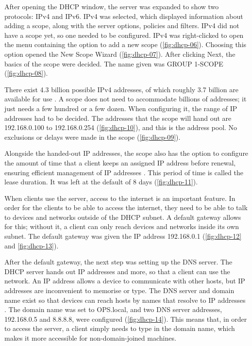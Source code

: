 After opening the DHCP window, the server was expanded to show two protocols: IPv4 and IPv6. IPv4 was selected, which displayed information about adding a scope, along with the server options, policies and filters. IPv4 did not have a scope yet, so one needed to be configured. IPv4 was right-clicked to open the menu containing the option to add a new scope (\autoref{fig:dhcp-06}). Choosing this option opened the New Scope Wizard (\autoref{fig:dhcp-07}). After clicking Next, the basics of the scope were decided. The name given was GROUP 1-SCOPE (\autoref{fig:dhcp-08}).


There exist 4.3 billion possible IPv4 addresses, of which roughly 3.7 billion are available for use \cite{ipme-ipv4}. A scope does not need to accommodate billions of addresses; it just needs a few hundred or a few dozen. When configuring it, the range of IP addresses had to be decided. The addresses that the scope will hand out are 192.168.0.100 to 192.168.0.254 (\autoref{fig:dhcp-10}), and this is the address pool. No exclusions or delays were made in the scope (\autoref{fig:dhcp-09}).

Alongside the handed-out IP addresses, the scope also has the option to configure the amount of time that a client keeps an assigned IP address before renewal, ensuring efficient management of IP addresses \cite{rapidseedbox-lease}. This period of time is called the lease duration. It was left at the default of 8 days (\autoref{fig:dhcp-11}).


When clients use the server, access to the internet is an important feature. In order for the clients to be able to access the internet, they need to be able to talk to devices and networks outside of the DHCP subnet. A default gateway allows for this; without it, a client can only reach devices and networks inside its own subnet. The default gateway was given the IP address 192.168.0.1 (\autoref{fig:dhcp-12} and \autoref{fig:dhcp-13}).


After the default gateway, the next step was setting up the DNS server. The DHCP server hands out IP addresses and more, so that a client can use the network. An IP address allows a device to communicate with other hosts, but IP addresses are inconvenient to memorise or type. The DNS server and domain name exist so that devices can reach hosts by names that resolve to IP addresses \cite{msft-dhcp-dns}. The domain name was set to OPS.local, and two DNS server addresses, 192.168.0.5 and 8.8.8.8, were configured (\autoref{fig:dhcp-14}). This means that, in order to access the server, a client simply needs to type in the domain name, which makes it more accessible for non-domain-joined machines.

